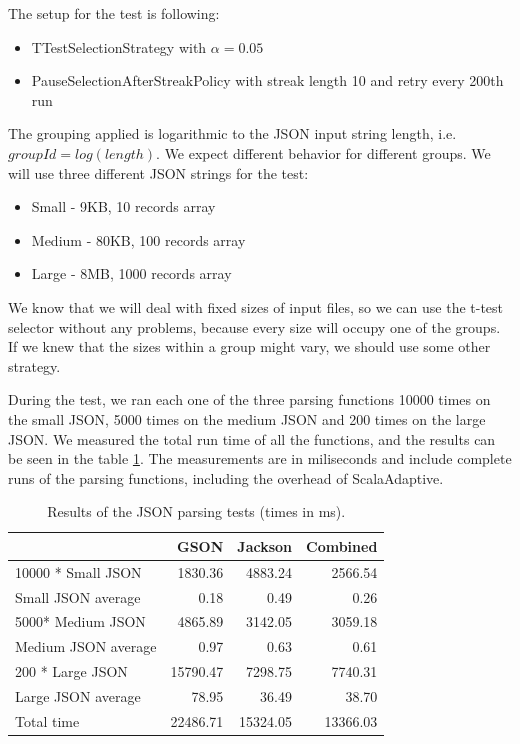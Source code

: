 The setup for the test is following:
\begin{itemize}
	\item TTestSelectionStrategy with $\alpha = 0.05$
	\item PauseSelectionAfterStreakPolicy with streak length 10 and retry every 200th run
\end{itemize}

The grouping applied is logarithmic to the JSON input string length, i.e. $groupId = log(length)$. We expect different behavior for different groups. We will use three different JSON strings for the test:

\begin{itemize}
	\item Small - 9KB, 10 records array
	\item Medium - 80KB, 100 records array
	\item Large - 8MB, 1000 records array
\end{itemize}

We know that we will deal with fixed sizes of input files, so we can use the t-test selector without any problems, because every size will occupy one of the groups. If we knew that the sizes within a group might vary, we should use some other strategy.

During the test, we ran each one of the three parsing functions 10000 times on the small JSON, 5000 times on the medium JSON and 200 times on the large JSON. We measured the total run time of all the functions, and the results can be seen in the table \ref{tab:json_parsing_results}. The measurements are in miliseconds and include complete runs of the parsing functions, including the overhead of ScalaAdaptive.

\begin{table}[h!]
\captionsetup{justification=centering,margin=0.5cm}
\bgroup
\def\arraystretch{1.5}%
\begin{center}
	\begin{tabular}{ | l | r | r | r | }
		\hline
		& \textbf{GSON} & \textbf{Jackson} & \textbf{Combined} \\ \hline
		10000 * Small JSON & 1830.36 & 4883.24 & 2566.54 \\ \hline	
		Small JSON average & 0.18 & 0.49 & 0.26 \\ \hline	
		5000* Medium JSON & 4865.89 & 3142.05 & 3059.18 \\ \hline	
		Medium JSON average & 0.97 & 0.63 & 0.61 \\ \hline	
		200 * Large JSON & 15790.47 & 7298.75 & 7740.31 \\ \hline	
		Large JSON average & 78.95 & 36.49 & 38.70 \\ \hline
		Total time & 22486.71 & 15324.05 & 13366.03 \\
		\hline
	\end{tabular}
\end{center}
\egroup
\caption{Results of the JSON parsing tests (times in ms).}
\label{tab:json_parsing_results}
\end{table}

